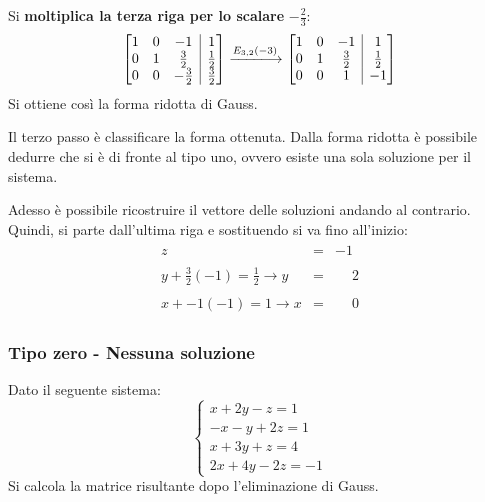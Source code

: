 \documentclass[a4paper]{article}
\makeatletter
\newenvironment{rowequmatbra}[1]{\left[\array{@{}#1@{}}}{\endarray\right]}
\makeatother
\begin{document}
	Si \textbf{moltiplica la terza riga per lo scalare} $-\frac{2}{3}$:
	\begin{equation*}
		\begin{rowequmatbra}{ccc|c}
			1  & 0 & -1 & 1 \\
			0  & 1 &  \frac{3}{2} & \frac{1}{2} \\
			0  & 0 &  -\frac{3}{2} & \frac{3}{2}
		\end{rowequmatbra} \xlongrightarrow{E_{3,2}\left(-3\right)}
		\begin{rowequmatbra}{ccc|c}
			1  & 0 & -1 & 1 \\
			0  & 1 &  \frac{3}{2} & \frac{1}{2} \\
			0  & 0 &  1 & -1
		\end{rowequmatbra}
	\end{equation*}
	Si ottiene così la forma ridotta di Gauss.\newline
	
	\noindent
	Il \textcolor{Red3}{terzo passo} è classificare la forma ottenuta. Dalla forma ridotta è possibile dedurre che si è di fronte al tipo uno, ovvero esiste una sola soluzione per il sistema.
	
	Adesso è possibile ricostruire il vettore delle soluzioni andando al contrario. Quindi, si parte dall'ultima riga e sostituendo si va fino all'inizio:
	\begin{gather*}
		\begin{array}{rll}
			z & = & -1 \\
			\\
			y + \frac{3}{2}\left(-1\right) = \frac{1}{2} \rightarrow y & = & \phantom{-}2 \\
			\\
			x + -1\left(-1\right) = 1 \rightarrow x & = & \phantom{-}0
		\end{array}
	\end{gather*}\newpage

	\subsubsection{Tipo zero - Nessuna soluzione}
	
	Dato il seguente sistema:
	\begin{equation*}
		\begin{cases}
			x + 2y - z = 1 	\\
			-x - y + 2z = 1 \\
			x + 3y + z = 4 	\\
			2x + 4y -2z = -1
		\end{cases}
	\end{equation*}
	Si calcola la matrice risultante dopo l'eliminazione di Gauss.\newline
	
\end{document}
